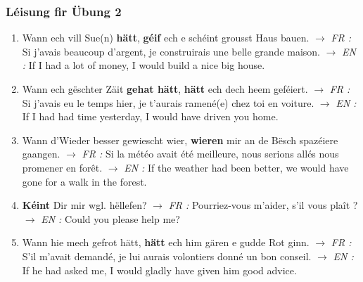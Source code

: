 \subsubsection*{Léisung fir Übung 2}
\begin{enumerate}
    \item Wann ech vill Sue(n) \textbf{hätt}, \textbf{géif} ech e schéint grousst Haus bauen.
    $\rightarrow$ \textit{FR :} Si j'avais beaucoup d'argent, je construirais une belle grande maison.
    $\rightarrow$ \textit{EN :} If I had a lot of money, I would build a nice big house.

    \item Wann ech gëschter Zäit \textbf{gehat hätt}, \textbf{hätt} ech dech heem geféiert.
    $\rightarrow$ \textit{FR :} Si j'avais eu le temps hier, je t'aurais ramené(e) chez toi en voiture.
    $\rightarrow$ \textit{EN :} If I had had time yesterday, I would have driven you home.

    \item Wann d'Wieder besser gewiescht wier, \textbf{wieren} mir an de Bësch spazéiere gaangen.
    $\rightarrow$ \textit{FR :} Si la météo avait été meilleure, nous serions allés nous promener en forêt.
    $\rightarrow$ \textit{EN :} If the weather had been better, we would have gone for a walk in the forest.

    \item \textbf{Kéint} Dir mir wgl. hëllefen?
    $\rightarrow$ \textit{FR :} Pourriez-vous m'aider, s'il vous plaît ?
    $\rightarrow$ \textit{EN :} Could you please help me?

    \item Wann hie mech gefrot hätt, \textbf{hätt} ech him gären e gudde Rot ginn.
    $\rightarrow$ \textit{FR :} S'il m'avait demandé, je lui aurais volontiers donné un bon conseil.
    $\rightarrow$ \textit{EN :} If he had asked me, I would gladly have given him good advice.
\end{enumerate}

